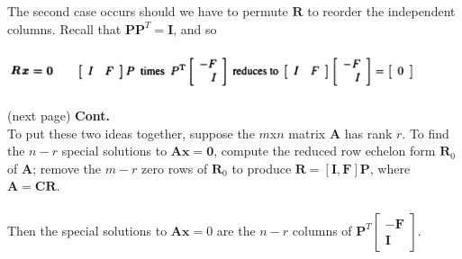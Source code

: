 \documentclass{report}
\begin{document}
The second case occurs should we have to permute $\bm R$ to reorder the independent columns. Recall that $\bm{PP}^T=\bm I$, and so
\begin{center}
\includegraphics[width=12cm]{34}
\end{center}
(next page)\newpage
\noindent\textbf{Cont.}\\
To put these two ideas together, suppose the $m$x$n$ matrix $\bm A$ has rank $r$. To find the $n-r$ special solutions to $\bm{Ax}=\bm0$, compute the reduced row
echelon form $\bm R_0$ of $\bm A$; remove the $m-r$ zero rows of $\bm R_0$ to produce $\bm R=[\bm I,\bm F]\bm P$, where $\bm A=\bm{CR}$.\\
\vspace{1mm}\\
Then the special solutions to $\bm{Ax}=0$ are the $n-r$ columns of $\bm P^T\left[\begin{array}{c}-\bm F\\\bm I\end{array}\right]$.
\newpage
\end{document}
